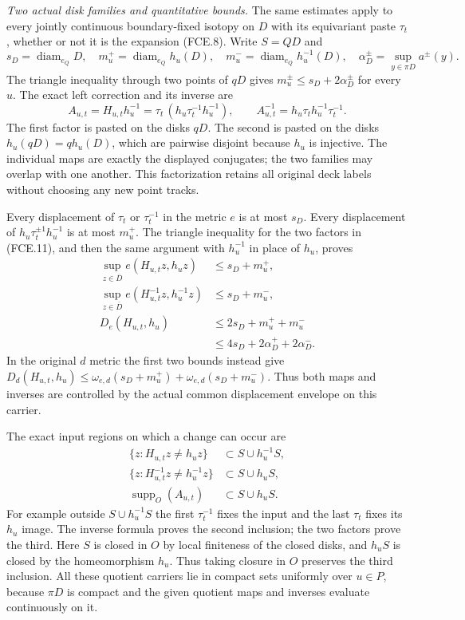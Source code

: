 \emph{Two actual disk families and quantitative bounds.}
The same estimates apply to every jointly continuous
boundary-fixed isotopy on $D$ with its equivariant paste
$\tau_t$, whether or not it is the expansion (FCE.8).
Write $S=QD$ and
\[
 s_D=\operatorname{diam}_{e_Q}D,\quad
 m_u^+=\operatorname{diam}_{e_Q}h_u(D),\quad
 m_u^-=\operatorname{diam}_{e_Q}h_u^{-1}(D),\quad
 \alpha_D^\pm=\sup_{y\in\pi D}a^\pm(y).
                                                               \tag{FCE.10}
\]
The triangle inequality through two points of $qD$ gives
$m_u^\pm\leq s_D+2\alpha_D^\pm$ for every $u$.
The exact left correction and its inverse are
\[
 A_{u,t}=H_{u,t}h_u^{-1}
       =\tau_t\,(h_u\tau_t^{-1}h_u^{-1}),\qquad
 A_{u,t}^{-1}=h_u\tau_t h_u^{-1}\tau_t^{-1}.
                                                               \tag{FCE.11}
\]
The first factor is pasted on the disks $qD$.
The second is pasted on the disks
$h_u(qD)=qh_u(D)$, which are pairwise disjoint because
$h_u$ is injective. The individual maps are exactly the
displayed conjugates; the two families may overlap with
one another. This factorization retains all original deck
labels without choosing any new point tracks.

Every displacement of $\tau_t$ or $\tau_t^{-1}$ in the
metric $e$ is at most $s_D$. Every displacement of
$h_u\tau_t^{\pm1}h_u^{-1}$ is at most $m_u^+$.
The triangle inequality for the two factors in (FCE.11),
and then the same argument with $h_u^{-1}$ in place of
$h_u$, proves
\[
 \begin{aligned}
 \sup_{z\in\overline D}e(H_{u,t}z,h_uz)&\leq s_D+m_u^+,\\
 \sup_{z\in\overline D}e(H_{u,t}^{-1}z,h_u^{-1}z)&\leq s_D+m_u^-,\\
 D_e(H_{u,t},h_u)&\leq2s_D+m_u^++m_u^-\\
                 &\leq4s_D+2\alpha_D^++2\alpha_D^-.
 \end{aligned}                                                 \tag{FCE.12}
\]
In the original $d$ metric the first two bounds instead give
$D_d(H_{u,t},h_u)\leq
\omega_{e,d}(s_D+m_u^+)+\omega_{e,d}(s_D+m_u^-)$.
Thus both maps and inverses are controlled by the actual
common displacement envelope on this carrier.

The exact input regions on which a change can occur are
\[
 \begin{aligned}
 \{z:H_{u,t}z\ne h_uz\}&\subset S\cup h_u^{-1}S,\\
 \{z:H_{u,t}^{-1}z\ne h_u^{-1}z\}&\subset S\cup h_uS,\\
 \operatorname{supp}_O(A_{u,t})&\subset S\cup h_uS.
 \end{aligned}                                                 \tag{FCE.13}
\]
For example outside $S\cup h_u^{-1}S$ the first
$\tau_t^{-1}$ fixes the input and the last $\tau_t$
fixes its $h_u$ image. The inverse formula proves the
second inclusion; the two factors prove the third.
Here $S$ is closed in $O$ by local finiteness of the
closed disks, and $h_uS$ is closed by the homeomorphism
$h_u$. Thus taking closure in $O$ preserves the third
inclusion.
All these quotient carriers lie in compact sets uniformly
over $u\in P$, because $\pi D$ is compact and the given
quotient maps and inverses evaluate continuously on it.

